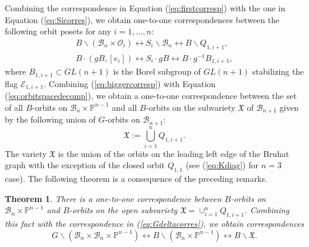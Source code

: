 \documentclass[12pt]{amsart}
\numberwithin{equation}{section}
\newtheorem{thm}{Theorem}[section]
\newcommand{\B}{\mathcal{B}}
\begin{document}
Combining the correspondence in Equation (\ref{eq:firstcorresp}) with the one in Equation (\ref{eq:Sicorres}), we obtain one-to-one correspondences between the following orbit posets for any $i=1,\dots, n$:
\begin{equation}\label{eq:biggercorresp}
\begin{split}
 B\backslash(\B_{n}\times \mathcal{O}_{i})\longleftrightarrow S_{i}\backslash\B_{n}\longleftrightarrow B\backslash Q_{1,i+1},\\
 B\cdot (gB,[e_i]) \longleftrightarrow S_i\cdot gB \longleftrightarrow B\cdot g^{-1}B_{1,i+1},
\end{split}  
\end{equation}
where $B_{1,i+1}\subset GL(n+1)$ is the Borel subgroup of $GL(n+1)$ stabilizing the flag $\mathcal{E}_{1,i+1}.$   Combining (\ref{eq:biggercorresp}) with Equation (\ref{eq:orbitspacedecomp}), we obtain a one-to-one correspondence between the set of all $B$-orbits on $\B_{n}\times\mathbb{P}^{n-1}$ and all $B$-orbits on the subvariety $\mathfrak{X}$ of $\B_{n+1}$ given by the following union of $G$-orbits on $\B_{n+1}$:
\begin{equation}\label{eq:frakX}
\mathfrak{X}:=\displaystyle\bigcup_{i=1}^{n} Q_{1,i+1}.
\end{equation}
The variety $\mathfrak{X}$ is the union of the orbits on the leading left edge of the Bruhat graph with the exception of the closed orbit $Q_{1,1}$ (see (\ref{eq:Kdiag}) for $n=3$ case).  The following theorem is a consequence of the preceding remarks.  



\begin{thm}\label{thm:globalcorresp}
There is a one-to-one correspondence between $B$-orbits on $\B_{n}\times \mathbb{P}^{n-1}$ and $B$-orbits on the open subvariety $\mathfrak{X}=\cup_{i=1}^{n} Q_{1,i+1}$.  Combining this fact with the correspondence in (\ref{eq:Gdeltacorres}), we obtain correspondences 
\begin{equation}\label{eq:secondcorresp}
G\backslash(\B_{n}\times\B_{n}\times\mathbb{P}^{n-1})\longleftrightarrow B\backslash (\B_{n}\times\mathbb{P}^{n-1} )\longleftrightarrow B\backslash \mathfrak{X}.
\end{equation}
\end{thm}
\end{document}
